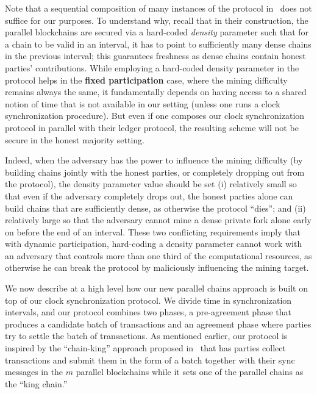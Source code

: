 Note that a sequential composition of many instances of the protocol in~\cite{EC:GarKiaShe24} does not suffice for our purposes.
%
To understand why, recall that in their construction, the parallel blockchains are secured via a hard-coded \emph{density} parameter such that for a chain to be valid in an interval, it has to point to sufficiently many dense chains in the previous interval; this guarantees freshness as dense chains contain honest parties' contributions.
%
While employing a hard-coded density parameter in the protocol helps in the \textbf{fixed participation} case, where the mining difficulty remains always the same, it fundamentally depends on having access to a shared notion of time that is not available in our setting (unless one runs a clock synchronization procedure).
%
But even if one composes our clock synchronization protocol in parallel with their ledger protocol, the resulting scheme will not be secure in the honest majority setting.

Indeed, when the adversary has the power to influence the mining difficulty (by building chains jointly with the honest parties, or completely dropping out from the protocol), the density parameter value should be set
%
(i) relatively small so that even if the adversary completely drops out, the honest parties alone can build chains that are sufficiently dense, as otherwise the protocol ``dies'';
%
and (ii) relatively large so that the adversary cannot mine a dense private fork alone early on before the end of an interval.
%
These two conflicting requirements imply that with dynamic participation, hard-coding a density parameter cannot work with an adversary that controls more than one third of the computational resources, as otherwise he can break the protocol by maliciously influencing the mining target.

We now describe at a high level how our new parallel chains approach is built on top of our clock synchronization protocol.
%
We divide time in synchronization intervals, and our protocol combines two phases, a pre-agreement phase that produces a candidate batch of transactions and an agreement phase where parties try to settle the batch of transactions.
%
As mentioned earlier, our protocol is inspired by the ``chain-king'' approach proposed in~\cite{EC:GarKiaShe24} that has parties collect transactions and submit them in the form of a batch together with their sync messages in the $m$ parallel blockchains while it sets one of the parallel chains as the ``king chain.''

